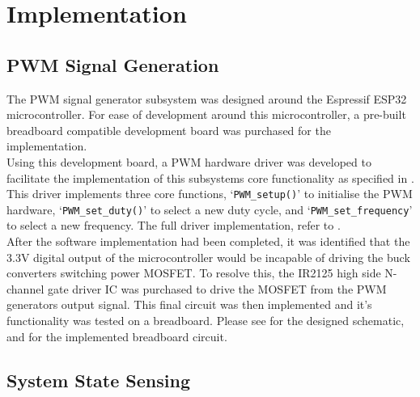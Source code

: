 \chapter{Implementation}\label{C:implementation}


\section{PWM Signal Generation}\label{S:pwm_gen_impl}

The PWM signal generator subsystem was designed around the Espressif ESP32 microcontroller. For ease of development around this microcontroller, a pre-built breadboard compatible development board was purchased for the implementation. \\

Using this development board, a PWM hardware driver was developed to facilitate the implementation of this subsystems core functionality as specified in . This driver implements three core functions, `\lstinline{PWM_setup()}' to initialise the PWM hardware, `\lstinline{PWM_set_duty()}' to select a new duty cycle, and `\lstinline{PWM_set_frequency}' to select a new frequency. The full driver implementation, refer to .\\

After the software implementation had been completed, it was identified that the 3.3V digital output of the microcontroller would be incapable of driving the buck converters switching power MOSFET. To resolve this, the IR2125 high side N-channel gate driver IC was purchased to drive the MOSFET from the PWM generators output signal. This final circuit was then implemented and it's functionality was tested on a breadboard. Please see  for the designed schematic, and  for the implemented breadboard circuit.



\section{System State Sensing}\label{S:current_sense_impl}

